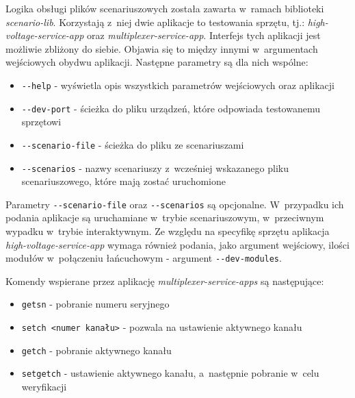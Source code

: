 

Logika obsługi plików scenariuszowych została zawarta w~ramach biblioteki \emph{scenario-lib}. Korzystają z~niej dwie aplikacje to testowania sprzętu, tj.: \emph{high-voltage-service-app} oraz \emph{multiplexer-service-app}. Interfejs tych aplikacji jest możliwie zbliżony do siebie. Objawia się to między innymi w~argumentach wejściowych obydwu aplikacji. Następne parametry są dla nich wspólne:
\begin{itemize}
    \item \lstinline{--help} - wyświetla opis wszystkich parametrów wejściowych oraz aplikacji
    \item \lstinline{--dev-port} - ścieżka do pliku urządzeń, które odpowiada testowanemu sprzętowi
    \item \lstinline{--scenario-file} - ścieżka do pliku ze scenariuszami
    \item \lstinline{--scenarios} - nazwy scenariuszy z~wcześniej wskazanego pliku scenariuszowego, które mają zostać uruchomione
\end{itemize}

Parametry \lstinline{--scenario-file} oraz \lstinline{--scenarios} są opcjonalne. W~przypadku ich podania aplikacje są uruchamiane w~trybie scenariuszowym, w~przeciwnym wypadku w~trybie interaktywnym. Ze względu na specyfikę sprzętu aplikacja \emph{high-voltage-service-app} wymaga również podania, jako argument wejściowy, ilości modułów w~połączeniu łańcuchowym - argument \lstinline{--dev-modules}.

Komendy wspierane przez aplikację \emph{multiplexer-service-apps} są następujące:
\begin{itemize}
    \item \lstinline{getsn} - pobranie numeru seryjnego
    \item \lstinline{setch <numer kanału>}  - pozwala na ustawienie aktywnego kanału
    \item \lstinline{getch} - pobranie aktywnego kanału
    \item \lstinline{setgetch} - ustawienie aktywnego kanału, a~następnie pobranie w~celu weryfikacji
\end{itemize}


